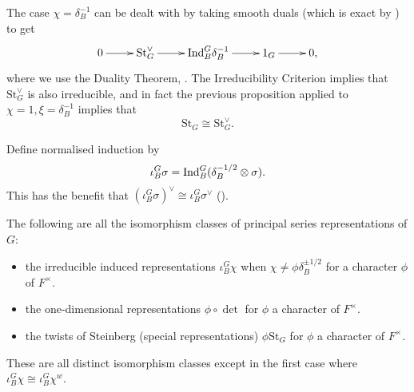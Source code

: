 The case $\chi = \delta_B^{-1}$ can be dealt with by taking smooth duals (which is exact by \cite[Lemma 2.10]{BH1}) to get 
$$\xymatrix{0 \ar[r] & \mathrm{St}_G^\vee \ar[r] & \Ind_B^G \delta_B^{-1} \ar[r] & 1_G \ar[r] & 0,}$$ where we use the Duality Theorem, \cite[Theorem 3.5]{BH1}. The Irreducibility Criterion implies that $\mathrm{St}_G^\vee$ is also irreducible, and in fact the previous proposition applied to $\chi=1, \xi = \delta_B^{-1}$ implies that
$$\mathrm{St}_G \cong \mathrm{St}_G^\vee.$$

\begin{notn}
    Define normalised induction by
    $$\iota_B^G \sigma = \mathrm{Ind}_B^G (\delta_B^{-1/2} \otimes \sigma).$$
    This has the benefit that $(\iota_B^G \sigma)^\vee \cong \iota_B^G \sigma^\vee$ (\cite[Theorem 3.5]{BH1}).
\end{notn}

\begin{thm}\label{classify}
    The following are all the isomorphism classes of principal series representations of $G$:
    \begin{itemize}
        \item the irreducible induced representations $\iota_B^G \chi$ when $\chi \neq \phi \delta_B^{\pm 1/2}$ for a character $\phi$ of $F^\times$.
        \item the one-dimensional representations $\phi \circ \det$ for $\phi$ a character of $F^\times$.
        \item the twists of Steinberg (special representations) $\phi \mathrm{St}_G$ for $\phi$ a character of $F^\times$.
    \end{itemize}
    These are all distinct isomorphism classes except in the first case where $\iota_B^G \chi \cong \iota_B^G \chi^w$.
\end{thm}

\newpage